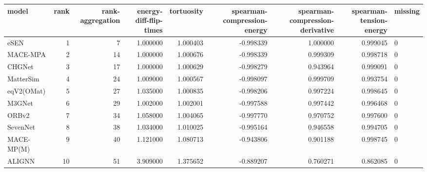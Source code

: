 \begin{tabular}{lrrrrrrrl}
\toprule
model & rank & rank-aggregation & energy-diff-flip-times & tortuosity & spearman-compression-energy & spearman-compression-derivative & spearman-tension-energy & missing \\
\midrule
eSEN & 1 & 7 & 1.000000 & 1.000403 & -0.998339 & 1.000000 & 0.999045 & 0 \\
MACE-MPA & 2 & 14 & 1.000000 & 1.000676 & -0.998339 & 0.999309 & 0.998718 & 0 \\
CHGNet & 3 & 17 & 1.000000 & 1.000629 & -0.998279 & 0.943964 & 0.999091 & 0 \\
MatterSim & 4 & 24 & 1.009000 & 1.000567 & -0.998097 & 0.999709 & 0.993754 & 0 \\
eqV2(OMat) & 5 & 27 & 1.035000 & 1.000835 & -0.998206 & 0.997224 & 0.998645 & 0 \\
M3GNet & 6 & 29 & 1.002000 & 1.002001 & -0.997588 & 0.997442 & 0.996468 & 0 \\
ORBv2 & 7 & 34 & 1.058000 & 1.004065 & -0.997770 & 0.970752 & 0.997600 & 0 \\
SevenNet & 8 & 38 & 1.034000 & 1.010025 & -0.995164 & 0.946558 & 0.994705 & 0 \\
MACE-MP(M) & 9 & 40 & 1.121000 & 1.080713 & -0.943806 & 0.901188 & 0.998745 & 0 \\
ALIGNN & 10 & 51 & 3.909000 & 1.375652 & -0.889207 & 0.760271 & 0.862085 & 0 \\
\bottomrule
\end{tabular}
